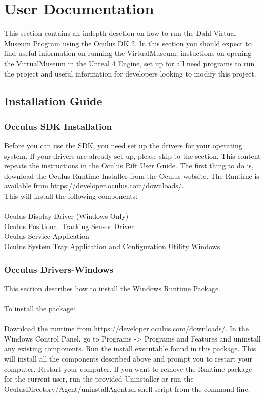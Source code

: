 

\chapter{User Documentation}

This section contains an indepth desction on how to run the Dahl Virtual Museum Program using the Oculus DK 2. In this section you should expect to find useful information on running the VirtualMuseum, instuctions on opening the VirtualMuseum in the Unreal 4 Engine, set up for all need programs to run the project and useful information for developers looking to modify this project. 



\section{Installation Guide}

\subsection{Occulus SDK Installation}
Before you can use the SDK, you need set up the drivers for your operating system. If your drivers are already set up, please skip to the  section. This content repeats the instructions in the Oculus Rift User Guide. The first thing to do is, download the Oculus Runtime Installer from the Oculus website. The Runtime is available from https://developer.oculus.com/downloads/.
\\ This will install the following components:
\\
\\Oculus Display Driver (Windows Only)
\\ Oculus Positional Tracking Sensor Driver
\\ Oculus Service Application
\\ Oculus System Tray Application and Configuration Utility Windows
\\

\subsection{Occulus Drivers-Windows}

This section describes how to install the Windows Runtime Package.
\\
\\To install the package:
\\
\\
Download the runtime from https://developer.oculus.com/downloads/. In the Windows Control Panel, go to Programs -> Programs and Features and uninstall any existing components. Run the install executable found in this package. This will install all the components described above and prompt you to restart your computer. Restart your computer. If you want to remove the Runtime package for the current user, run the provided Uninstaller or run the OculusDirectory/Agent/uninstallAgent.sh shell script from the command line.


